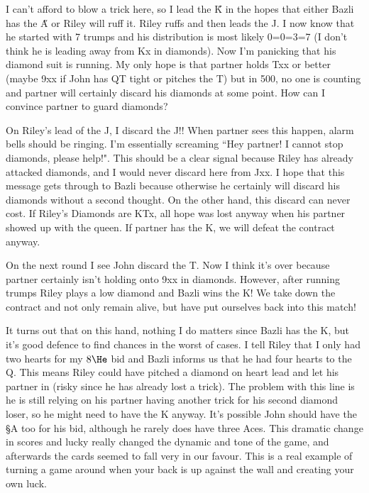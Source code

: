\documentclass[a4paper]{JoshCards}
\begin{document}
I can't afford to blow a trick here, so I lead the \H K in the hopes that either Bazli has the \H A or Riley will ruff it. Riley ruffs and then leads the \C J. I now know that he started with 7 trumps and his distribution is most likely 0=0=3=7 (I don't think he is leading away from Kx in diamonds). Now I'm panicking that his diamond suit is running. My only hope is that partner holds Txx or better (maybe 9xx if John has QT tight or pitches the T) but in 500, no one is counting and partner will certainly discard his diamonds at some point. How can I convince partner to guard diamonds?

On Riley's lead of the \C J, I discard the \D J!! When partner sees this happen, alarm bells should be ringing. I'm essentially screaming ``Hey partner! I cannot stop diamonds, please help!". This should be a clear signal because Riley has already attacked diamonds, and I would never discard here from \D Jxx. I hope that this message gets through to Bazli because otherwise he certainly will discard his diamonds without a second thought. On the other hand, this discard can never cost. If Riley's Diamonds are \D KTx, all hope was lost anyway when his partner showed up with the queen. If partner has the \D K, we will defeat the contract anyway.

On the next round I see John discard the \D T. Now I think it's over because partner certainly isn't holding onto 9xx in diamonds. However, after running trumps Riley plays a low diamond and Bazli wins the \D K! We take down the contract and not only remain alive, but have put ourselves back into this match!

It turns out that on this hand, nothing I do matters since Bazli has the \D K, but it's good defence to find chances in the worst of cases. I tell Riley that I only had two hearts for my $8\He$ bid and Bazli informs us that he had four hearts to the Q. This means Riley could have pitched a diamond on heart lead and let his partner in (risky since he has already lost a trick). The problem with this line is he is still relying on his partner having another trick for his second diamond loser, so he might need to have the \D K anyway. It's possible John should have the \S A too for his bid, although he rarely does have three Aces. This dramatic change in scores and lucky really changed the dynamic and tone of the game, and afterwards the cards seemed to fall very in our favour. This is a real example of turning a game around when your back is up against the wall and creating your own luck.
\end{document}
